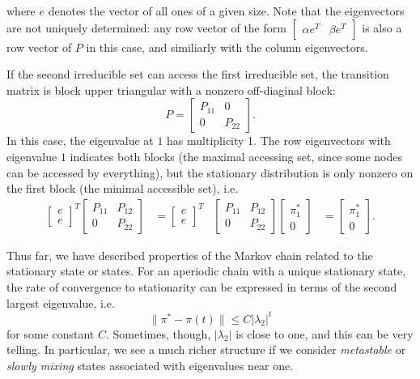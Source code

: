 \documentclass[12pt, leqno]{article} %
\begin{document}
where $e$ denotes the vector of all ones of a given size.
Note that the eigenvectors are not uniquely determined: any row vector
of the form $\begin{bmatrix} \alpha e^T & \beta e^T \end{bmatrix}$ is
also a row vector of $P$ in this case, and similiarly with the column
eigenvectors.

If the second irreducible set can access the first irreducible set,
the transition matrix is block upper triangular with a nonzero
off-diaginal block:
\[
  P = \begin{bmatrix} P_{11} & 0 \\ 0 & P_{22} \end{bmatrix}.
\]
In this case, the eigenvalue at $1$ has multiplicity 1.
The row eigenvectors with eigenvalue $1$ indicates
both blocks (the maximal accessing set, since some nodes can be
accessed by everything), but the stationary distribution is only
nonzero on the first block (the minimal accessible set), i.e.
\begin{align*}
  \begin{bmatrix} e \\ e \end{bmatrix}^T
  \begin{bmatrix} P_{11} & P_{12} \\ 0 & P_{22} \end{bmatrix} &= 
  \begin{bmatrix} e \\ e \end{bmatrix}^T &
  \begin{bmatrix} P_{11} & P_{12} \\ 0 & P_{22} \end{bmatrix}
  \begin{bmatrix} \pi_1^* \\ 0 \end{bmatrix} &=
  \begin{bmatrix} \pi_1^* \\ 0 \end{bmatrix}.
\end{align*}

Thus far, we have described properties of the Markov chain related to
the stationary state or states.  For an aperiodic chain with a unique
stationary state, the rate of convergence to stationarity can be
expressed in terms of the second largest eigenvalue, i.e.
\[
  \|\pi^* - \pi(t)\| \leq C |\lambda_2|^t
\]
for some constant $C$.  Sometimes, though, $|\lambda_2|$ is close to
one, and this can be very telling.  In particular, we see a much
richer structure if we consider {\em metastable} or
{\em slowly mixing} states associated with eigenvalues near one.
\end{document}
